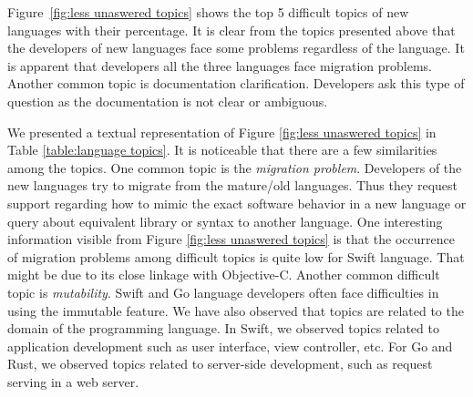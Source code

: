 Figure~\ref{fig:less unaswered topics} shows the top 5 difficult topics of new languages with their percentage. It is clear from the topics presented above that the developers of new languages face some problems regardless of the language. 
It is apparent that developers all the three languages face migration problems. 
Another common topic is documentation clarification. Developers ask this type of question as the documentation is not clear or ambiguous. 

We presented a textual representation of Figure \ref{fig:less unaswered topics} in Table \ref{table:language topics}. It is noticeable that there are a few similarities among the topics. One common topic is the  \emph{migration problem}. Developers of the new languages try to migrate from the mature/old languages. Thus they request support regarding how to mimic the exact software behavior in a new language or query about equivalent library or syntax to another language. One interesting information visible from Figure \ref{fig:less unaswered topics} is that the occurrence of migration problems among difficult topics is quite low for Swift language. That might be due to its close linkage with Objective-C. Another common difficult topic is  \emph{mutability}. Swift and Go language developers often face difficulties in using the immutable feature. We have also observed that topics are related to the domain of the programming language. In Swift, we observed topics related to application development such as user interface, view controller, etc. For Go and Rust, we observed topics related to server-side development, such as request serving in a web server.

